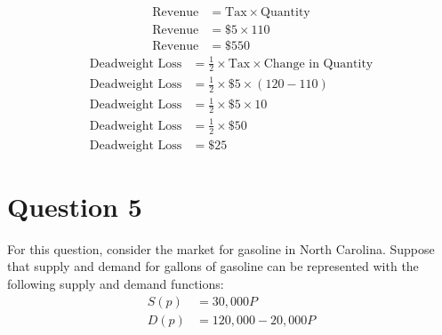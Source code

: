 \documentclass{article}
\newcommand{\question}[1]{\pagebreak\section{Question #1}}
\begin{document}
\begin{enumerate}[(a)]
    \begin{align*}
        \text{Revenue} &= \text{Tax} \times \text{Quantity}\\
        \text{Revenue} &= \$5 \times 110\\
        \text{Revenue} &= \$550
    \end{align*}
    \begin{align*}
        \text{Deadweight Loss} &= \frac{1}{2} \times \text{Tax} \times \text{Change in Quantity}\\
        \text{Deadweight Loss} &= \frac{1}{2} \times \$5 \times (120 - 110)\\
        \text{Deadweight Loss} &= \frac{1}{2} \times \$5 \times 10\\
        \text{Deadweight Loss} &= \frac{1}{2} \times \$50\\
        \text{Deadweight Loss} &= \$25
    \end{align*}

\end{enumerate}

\pagebreak

\question{5}

For this question, consider the market for gasoline in North Carolina. Suppose that supply and demand for gallons of gasoline can be represented with the following supply and demand functions:
\begin{align*}
    S(p) &= 30,000P\\
    D(p) &= 120,000 - 20,000P
\end{align*}
\end{document}
